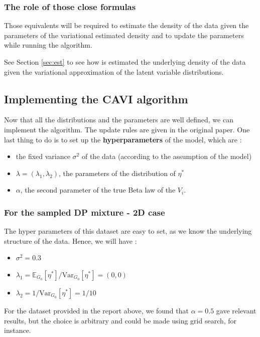 \documentclass{article}
\begin{document}
\subsubsection{The role of those close formulas}
Those equivalents will be required to estimate the density of the data given the parameters of the variational estimated density and to update the parameters while running the algorithm.

See Section \ref{sec:est} to see how is estimated the underlying density of the data given the variational approximation of the latent variable distributions.


\subsection{Implementing the CAVI algorithm}
Now that all the distributions and the parameters are well defined, we can implement the algorithm. The update rules are given in the original paper.
One last thing to do is to set up the \textbf{hyperparameters} of the model, which are :


\begin{itemize}
    \item the fixed variance $\sigma^2$ of the data (according to the assumption of the model)
    \item $\lambda = (\lambda_1, \lambda_2)$, the parameters of the distribution of $\eta^*$
    \item $\alpha$, the second parameter of the true Beta law of the $V_i$.
\end{itemize}

\subsubsection{For the sampled DP mixture - 2D case}
The hyper parameters of this dataset are easy to set, as we know the underlying structure of the data.
Hence, we will have :

\begin{itemize}
    \item $\sigma^2 = 0.3$
    \item $\lambda_1 = \mathbb{E}_{G_0}[\eta^*] / \text{Var}_{G_0}[\eta^*] = (0, 0)$
    \item $\lambda_2 = 1 / \text{Var}_{G_0}[\eta^*] = 1/10$
\end{itemize}

For the dataset provided in the report above, we found that $\alpha = 0.5$ gave relevant results, but the choice is arbitrary and could be made using grid search, for instance.
\end{document}
